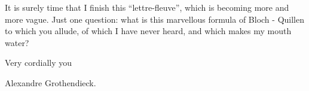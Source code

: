 

It is surely time that I finish this ``lettre-fleuve'', which is becoming
more and more vague. Just one question: what is this marvellous formula
of Bloch - Quillen to which you allude,  of which I have never heard,
and which makes my mouth water?

Very cordially  you

Alexandre Grothendieck.

